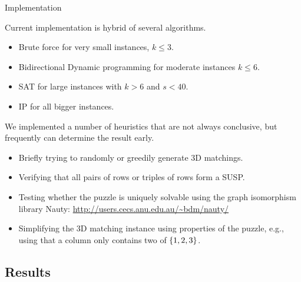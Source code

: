 \documentclass[t,10pt,
mathserif,xcolor=dvipsnames]{beamer}
\begin{document}
\begin{myframe}{Implementation}

  Current implementation is hybrid of several algorithms.
  \begin{itemize}
  \item Brute force for very small instances, $k \le3$.
  \item Bidirectional Dynamic programming for moderate instances $k
    \le 6$.
  \item SAT for large instances with $k > 6$ and $s < 40$.
  \item IP for all bigger instances.
  \end{itemize}

  \bigskip

  We implemented a number of heuristics that are not always conclusive,
  but frequently can determine the result early.
  \begin{itemize}
  \item Briefly trying to randomly or greedily generate 3D matchings.
  \item Verifying that all pairs of rows or triples of rows form a SUSP.
  \item Testing whether the puzzle is uniquely solvable using the graph
    isomorphism library Nauty: \url{http://users.cecs.anu.edu.au/~bdm/nauty/}
  \item Simplifying the 3D matching instance using properties of the
    puzzle, e.g., using that a column only contains two of $\{{1,2,3}\}$.
  \end{itemize}
  
\end{myframe}


\subsection{Results}
\end{document}

